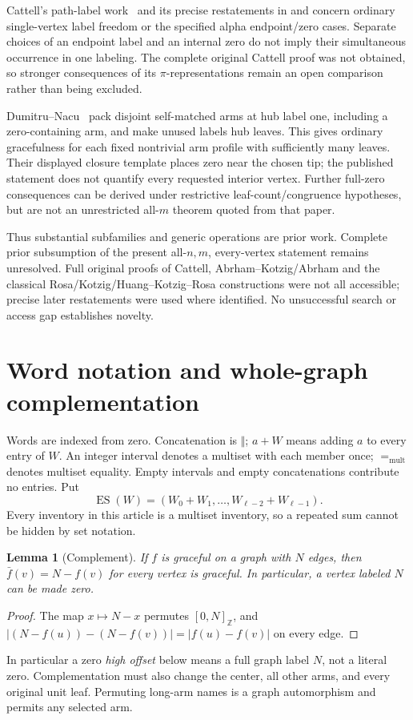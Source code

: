 \documentclass[11pt,a4paper]{article}
\newtheorem{lemma}[theorem]{Lemma}
\theoremstyle{definition}\newtheorem{definition}[theorem]{Definition}
\theoremstyle{remark}\newtheorem{remark}[theorem]{Remark}
\newcommand{\cat}{\mathbin{\Vert}}
\newcommand{\ints}[2]{[#1,#2]_{\mathbb Z}}
\newcommand{\ES}{\operatorname{ES}}
\newcommand{\mult}{\mathrel{=_{\mathrm{mult}}}}
\begin{document}
Cattell's path-label work~\cite{cattell} and its precise restatements in
\cite[Lemma 5]{lcr} and \cite[Lemma 2]{sz} concern ordinary
single-vertex label freedom or the specified alpha endpoint/zero cases.
Separate choices of an endpoint label and an internal zero do not imply
their simultaneous occurrence in one labeling. The complete original
Cattell proof was not obtained, so stronger consequences of its
$\pi$-representations remain an open comparison rather than being excluded.

Dumitru--Nacu~\cite[Theorems 3.3--3.5 and Corollary 3.6]{dn} pack
disjoint self-matched arms at hub label one, including a zero-containing
arm, and make unused labels hub leaves. This gives ordinary gracefulness
for each fixed nontrivial arm profile with sufficiently many leaves.
Their displayed closure template places zero near the chosen tip;
the published statement does not quantify every requested interior
vertex. Further full-zero consequences can be derived under restrictive
leaf-count/congruence hypotheses, but are not an unrestricted all-$m$
theorem quoted from that paper.

Thus substantial subfamilies and generic operations are prior work.
Complete prior subsumption of the present all-$n,m$, every-vertex
statement remains unresolved. Full original proofs of Cattell,
Abrham--Kotzig/Abrham and the classical Rosa/Kotzig/Huang--Kotzig--Rosa
constructions were not all accessible; precise later restatements were
used where identified. No unsuccessful search or access gap establishes
novelty.

\section{Word notation and whole-graph complementation}
Words are indexed from zero. Concatenation is $\cat$; $a+W$ means
adding $a$ to every entry of $W$. An integer interval denotes a multiset
with each member once; $\mult$ denotes multiset equality. Empty intervals
and empty concatenations contribute no entries. Put
\[
 \ES(W)=(W_0+W_1,\ldots,W_{\ell-2}+W_{\ell-1}).
\]
Every inventory in this article is a multiset inventory, so a repeated
sum cannot be hidden by set notation.

\begin{lemma}[Complement]\label{lem:complement}
If $f$ is graceful on a graph with $N$ edges, then $\bar f(v)=N-f(v)$
for \emph{every} vertex is graceful. In particular, a vertex labeled $N$
can be made zero.
\end{lemma}
\begin{proof}
The map $x\mapsto N-x$ permutes $\ints0N$, and
$|(N-f(u))-(N-f(v))|=|f(u)-f(v)|$ on every edge.
\end{proof}
In particular a zero \emph{high offset} below means a full graph label
$N$, not a literal zero. Complementation must also change the center,
all other arms, and every original unit leaf. Permuting long-arm names is
a graph automorphism and permits any selected arm.
\end{document}
